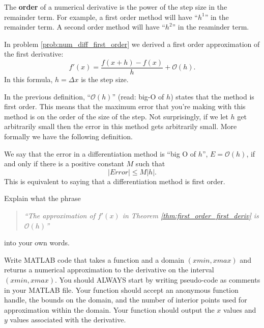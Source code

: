 \begin{definition}
    The {\bf order} of a numerical derivative is the power of the step size in the
    remainder term.  For example, a first order method will have ``$h^1$'' in the
    remainder term.  A second order method will have ``$h^2$'' in the reaminder term.
\end{definition}

\begin{thm}\label{thm:first_order_first_deriv}
    In problem \ref{prob:num_diff_first_order} we derived a first order approximation of
    the first derivative:
    \[ f'(x) = \frac{f(x+h) - f(x)}{h} + \mathcal{O}(h). \]
    In this formula, $h = \Delta x$ is the step size.
\end{thm}
In the previous definition, ``$\mathcal{O}(h)$'' (read: big-O of $h$) states that the
method is first order.  This means that the maximum error that you're making with this
method is on the order of the size of the step.  Not surprisingly, if we let $h$ get
arbitrarily small then the error in this method gets arbitrarily small.  More formally we
have the following definition.

\begin{definition}
    We say that the error in a differentiation method is ``big O of $h$'', $E =
    \mathcal{O}(h)$, if and only if there is a positive constant $M$ such that 
    \[ |Error| \le M |h|. \]
    This is equivalent to saying that a differentiation method is first order.
\end{definition}

\begin{problem}
    Explain what the phrase
    \begin{quote}
        {\it ``The approximation of $f'(x)$ in Theorem \ref{thm:first_order_first_deriv} is $\mathcal{O}(h)$''}
    \end{quote}
    into your own words.  
\end{problem}

\begin{problem}
    Write MATLAB code that takes a function and a domain $(xmin,xmax)$ and
    returns a numerical approximation to the derivative on the interval
    $(xmin,xmax)$. You should ALWAYS start by writing pseudo-code as comments in your
    MATLAB file.   Your function should accept an anonymous function handle, the
    bounds on the domain, and the number of interior points used for approximation within
    the domain.  Your function should output the $x$ values and $y$ values associated with
    the derivative.\\
\end{problem}

